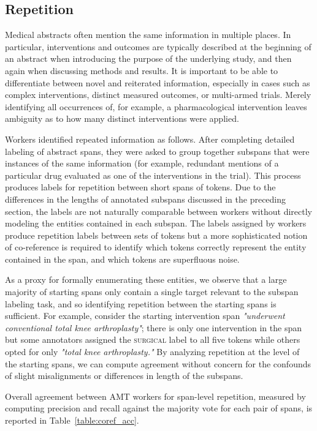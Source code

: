 \documentclass[11pt,a4paper]{article}
\begin{document}
\subsection{Repetition}
\label{section:corpus-coref}

Medical abstracts often mention the same information in multiple places.
In particular, interventions and outcomes are typically described at the beginning of an abstract when introducing the purpose of the underlying study, and then again when discussing methods and results. It is important to be able to differentiate between novel and reiterated information, especially in cases such as complex interventions, distinct measured outcomes, or multi-armed trials. Merely identifying all occurrences of, for example, a pharmacological intervention leaves ambiguity as to how many distinct interventions were applied.

Workers identified repeated information as follows. After completing detailed labeling of abstract spans, they were asked to group together subspans that were instances of the same information (for example, redundant mentions of a particular drug evaluated as one of the interventions in the trial).
This process produces labels for repetition between short spans of tokens.
Due to the differences in the lengths of annotated subspans discussed in the preceding section, the labels are not naturally comparable between workers without directly modeling the entities contained in each subspan.
The labels assigned by workers produce repetition labels between sets of tokens but a more sophisticated notion of co-reference is required to identify which tokens correctly represent the entity contained in the span, and which tokens are superfluous noise.

As a proxy for formally enumerating these entities, we observe that a large majority of starting spans only contain a single target relevant to the subspan labeling task, and so identifying repetition between the starting spans is sufficient.
For example, consider the starting intervention span \emph{"underwent conventional total knee arthroplasty"}; there is only one intervention in the span but some annotators assigned the \textsc{surgical} label to all five tokens while others opted for only \emph{"total knee arthroplasty."}
By analyzing repetition at the level of the starting spans, we can compute agreement without concern for the confounds of slight misalignments or differences in length of the subspans.

Overall agreement between AMT workers for span-level repetition, measured by computing precision and recall against the majority vote for each pair of spans, is reported in Table~\ref{table:coref_acc}.
\end{document}
